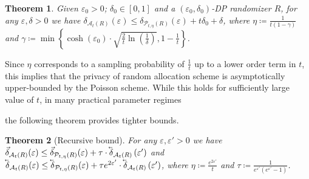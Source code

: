 \documentclass{article}
\newif\ifconferencemode
\newif\ifconferencemode
\newcommand{\mainThmAsym}{thm:analBnd}
\newcommand{\mainThmRec}{thm:analBnd}
\newcommand{\mainThmAsym}{thm:asymBnd}
\newcommand{\mainThmRec}{thm:recBnd}
\theoremstyle{plain}
\newtheorem{theorem}{Theorem}[section]
\theoremstyle{definition}
\newcommand{\eps}{\varepsilon}
\newcommand{\lvec}[1]{\reflectbox{$\vec{\reflectbox{$#1$}}$}}
\newcommand{\rand}{R}
\newcommand{\Pois}[2]{\mathcal{P}_{#1}\left(#2\right)}
\newcommand{\alloc}[2]{\mathcal{A}_{#1}\left(#2\right)}
\newcommand{\add}[1]{\lvec{#1}}
\newcommand{\rem}[1]{\vec{#1}}
\newcommand{\privProf}[1]{\delta_{#1}}
\newcommand{\privProfAdd}[1]{\add{\delta}_{#1}}
\newcommand{\privProfRem}[1]{\rem{\delta}_{#1}}
\begin{document}
\ifconferencemode
\begin{theorem}\label{\mainThmAsym}
    Given $\eps_{0} > 0$; $\delta_{0} \in [0, 1]$ and a $(\eps_{0}, \delta_{0})$-DP randomizer $\rand$, for any $\eps, \delta > 0$ we have $\privProf{\alloc{t}{\rand}}(\eps) \le \privProf{\Pois{t, \eta}{\rand}}(\eps) + t \delta_{0} + \delta$, where $\eta \coloneqq \frac{1}{t(1-\gamma)}$ and $\gamma \coloneqq \min \left\{\cosh(\eps_{0}) \cdot \sqrt{\frac{2}{t} \ln \left(\frac{1}{\delta} \right)}, 1 -\frac{1}{t} \right\}$.
    
    Furthermore, for any $\eps, \eps' > 0$ and randomizer $\rand$ we have $\privProfRem{\alloc{t}{\rand}}(\eps) \le \privProfRem{\Pois{t, \eta}{\rand}}(\eps) + \tau \cdot \privProfAdd{\alloc{t}{\rand}}\left(\eps' \right)$ and $\privProfAdd{\alloc{t}{\rand}}(\eps) \le \privProfAdd{\Pois{t, \eta}{\rand}}(\eps) + \tau e^{2 \eps'} \cdot \privProfAdd{\alloc{t}{\rand}}\left(\eps' \right)$, where $\eta \coloneqq \frac{e^{2 \eps'}}{t}$ and $\tau \coloneqq \frac{1}{e^{\eps'}(e^{\eps'}-1)}$.
\end{theorem}
\else
\begin{theorem}\label{\mainThmAsym}
        Given $\eps_{0} > 0$; $\delta_{0} \in [0, 1]$ and a $(\eps_{0}, \delta_{0})$-DP randomizer $\rand$, for any $\eps, \delta > 0$ we have $\privProf{\alloc{t}{\rand}}(\eps) \le \privProf{\Pois{t, \eta}{\rand}}(\eps) + t \delta_{0} + \delta$, where $\eta \coloneqq \frac{1}{t(1-\gamma)}$ and $\gamma \coloneqq \min \left\{\cosh(\eps_{0}) \cdot \sqrt{\frac{2}{t} \ln \left(\frac{1}{\delta} \right)}, 1 -\frac{1}{t} \right\}$.
\end{theorem}
\fi

Since $\eta$ corresponds to a sampling probability of $\frac{1}{t}$ up to a lower order term in $t$, this implies that the privacy of random allocation scheme is asymptotically upper-bounded by the Poisson scheme. While this holds for sufficiently large value of $t$, in many practical parameter regimes
\ifconferencemode
the second part of the theorem provides tighter bounds.
\else
the following theorem provides tighter bounds.
\begin{theorem}[Recursive bound]\label{\mainThmRec}
    For any $\eps, \eps' > 0$ we have $\privProfRem{\alloc{t}{\rand}}(\eps) \le \privProfRem{\Pois{t, \eta}{\rand}}(\eps) + \tau \cdot \privProfAdd{\alloc{t}{\rand}}\left(\eps' \right)$ and $\privProfAdd{\alloc{t}{\rand}}(\eps) \le \privProfAdd{\Pois{t, \eta}{\rand}}(\eps) + \tau e^{2 \eps'} \cdot \privProfAdd{\alloc{t}{\rand}}\left(\eps' \right)$,
    where $\eta \coloneqq \frac{e^{2 \eps'}}{t}$ and $\tau \coloneqq \frac{1}{e^{\eps'}(e^{\eps'}-1)}$.
\end{theorem}
\fi
\end{document}
